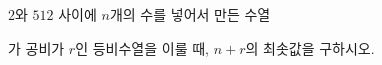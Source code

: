 $2$와 $512$ 사이에 $n$개의 수를 넣어서 만든 수열 \par\smallskip{}\par\smallskip\noindent 가 공비가 $r$인 등비수열을 이룰 때, $n+r$의 최솟값을 \mbox{구하시오.} 
